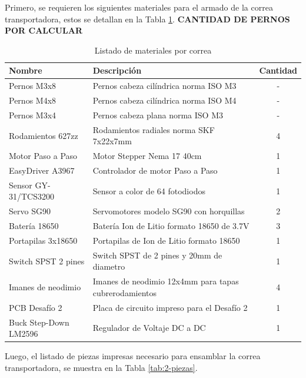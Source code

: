 \par Primero, se requieren los siguientes materiales para el armado de la correa transportadora, estos se detallan en la Tabla \ref{tab:2-materiales}.
\textbf{CANTIDAD DE PERNOS POR CALCULAR}
\begin{table}[H]
\centering
\caption{Listado de materiales por correa}
\begin{tabular}{|l|l|c|}
    \hline
    \textbf{Nombre} & \textbf{Descripción} & \textbf{Cantidad} \\
    \hline
    Pernos M3x8 & Pernos cabeza cilíndrica norma ISO M3 & - \\
    \hline
    Pernos M4x8 & Pernos cabeza cilíndrica norma ISO M4 & - \\
    \hline
    Pernos M3x4 & Pernos cabeza plana norma ISO M3 & - \\
    \hline
    Rodamientos 627zz & Rodamientos radiales norma SKF 7x22x7mm & 4 \\
    \hline
    Motor Paso a Paso & Motor Stepper Nema 17 40cm & 1 \\
    \hline
    EasyDriver A3967 & Controlador de motor Paso a Paso & 1 \\
    \hline
    Sensor GY-31/TCS3200 & Sensor a color de 64 fotodiodos & 1 \\
    \hline
    Servo SG90 & Servomotores modelo SG90 con horquillas & 2 \\
    \hline
    Batería 18650 & Batería Ion de Litio formato 18650 de 3.7V & 3 \\
    \hline
    Portapilas 3x18650 & Portapilas de Ion de Litio formato 18650 & 1 \\
    \hline
    Switch SPST 2 pines & Switch SPST de 2 pines y 20mm de diametro & 1 \\
    \hline
    Imanes de neodimio & Imanes de neodimio 12x4mm para tapas cubrerodamientos & 4 \\
    \hline
    PCB Desafío 2 & Placa de circuito impreso para el Desafío 2 & 1 \\
    \hline 
    Buck Step-Down LM2596 & Regulador de Voltaje DC a DC & 1 \\
    \hline
\end{tabular}
\label{tab:2-materiales}
\end{table}

\par Luego, el listado de piezas impresas necesario para ensamblar la correa transportadora, se muestra en la Tabla \ref{tab:2-piezas}.

